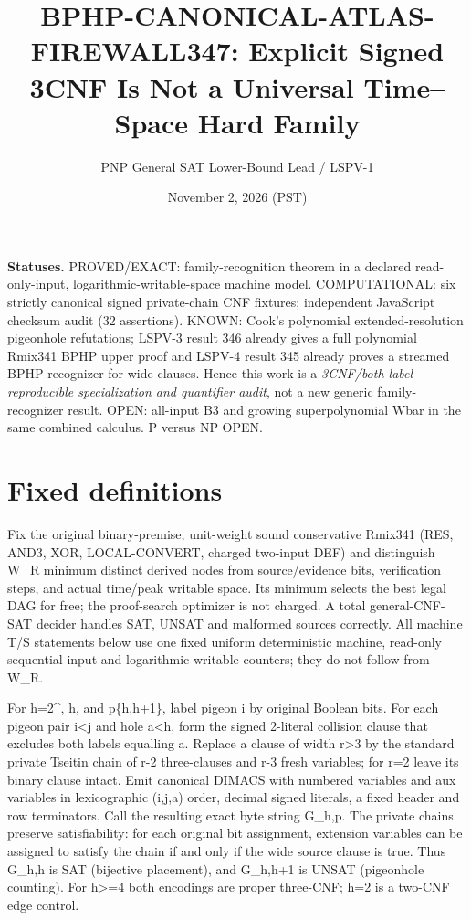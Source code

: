 \documentclass[11pt]{article}
\title{BPHP-CANONICAL-ATLAS-FIREWALL347: Explicit Signed 3CNF Is Not a Universal Time--Space Hard Family}
\author{PNP General SAT Lower-Bound Lead / LSPV-1}
\date{November 2, 2026 (PST)}
\begin{document}
\maketitle
\noindent\textbf{Statuses.} PROVED/EXACT: family-recognition theorem in a declared read-only-input, logarithmic-writable-space machine model. COMPUTATIONAL: six strictly canonical signed private-chain CNF fixtures; independent JavaScript checksum audit (32 assertions). KNOWN: Cook's polynomial extended-resolution pigeonhole refutations; LSPV-3 result 346 already gives a full polynomial Rmix341 BPHP upper proof and LSPV-4 result 345 already proves a streamed BPHP recognizer for wide clauses. Hence this work is a \emph{3CNF/both-label reproducible specialization and quantifier audit}, not a new generic family-recognizer result. OPEN: all-input B3 and growing superpolynomial Wbar in the same combined calculus. P versus NP OPEN.

\section*{Fixed definitions}
Fix the original binary-premise, unit-weight sound conservative Rmix341 (RES, AND3, XOR, LOCAL-CONVERT, charged two-input DEF) and distinguish W_R minimum distinct derived nodes from source/evidence bits, verification steps, and actual time/peak writable space. Its minimum selects the best legal DAG for free; the proof-search optimizer is not charged. A total general-CNF-SAT decider handles SAT, UNSAT and malformed sources correctly. All machine T/S statements below use one fixed uniform deterministic machine, read-only sequential input and logarithmic writable counters; they do not follow from W_R.

For h=2^\ell, h, and p\in\{h,h+1\}, label pigeon i by \ell original Boolean bits. For each pigeon pair i<j and hole a<h, form the signed 2\ell-literal collision clause that excludes both labels equalling a. Replace a clause of width r>3 by the standard private Tseitin chain of r-2 three-clauses and r-3 fresh variables; for r=2 leave its binary clause intact. Emit canonical DIMACS with numbered variables and aux variables in lexicographic (i,j,a) order, decimal signed literals, a fixed header and row terminators. Call the resulting exact byte string G_{h,p}. The private chains preserve satisfiability: for each original bit assignment, extension variables can be assigned to satisfy the chain if and only if the wide source clause is true. Thus G_{h,h} is SAT (bijective placement), and G_{h,h+1} is UNSAT (pigeonhole counting). For h>=4 both encodings are proper three-CNF; h=2 is a two-CNF edge control.
\end{document}
